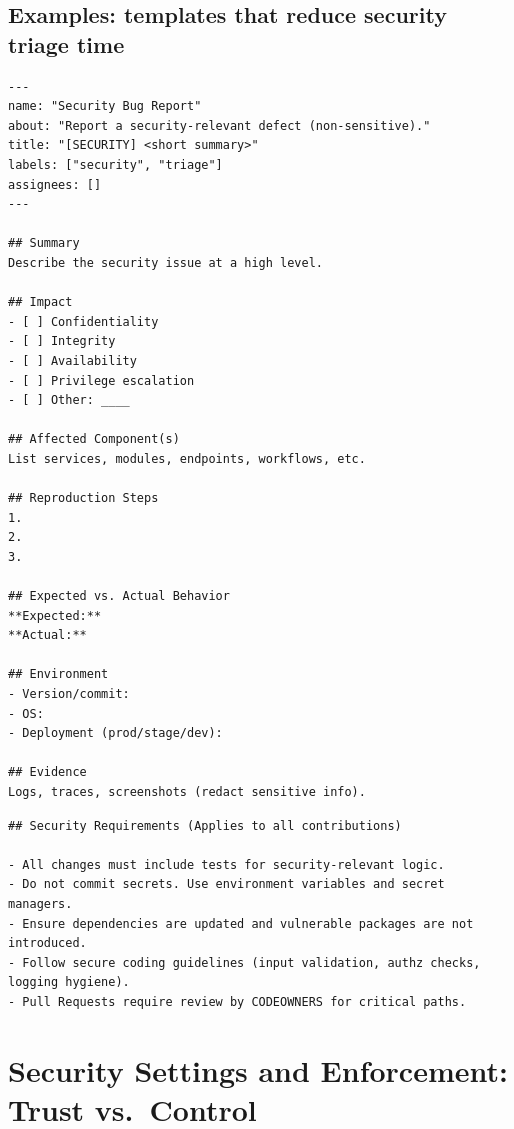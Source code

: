 \documentclass[11pt]{article}
\begin{document}
\subsection{Examples: templates that reduce security triage time}

\begin{examplebox}[title={Example: Security-focused bug report issue template (Markdown)}]
\begin{verbatim}
---
name: "Security Bug Report"
about: "Report a security-relevant defect (non-sensitive)."
title: "[SECURITY] <short summary>"
labels: ["security", "triage"]
assignees: []
---

## Summary
Describe the security issue at a high level.

## Impact
- [ ] Confidentiality
- [ ] Integrity
- [ ] Availability
- [ ] Privilege escalation
- [ ] Other: ____

## Affected Component(s)
List services, modules, endpoints, workflows, etc.

## Reproduction Steps
1.
2.
3.

## Expected vs. Actual Behavior
**Expected:**
**Actual:**

## Environment
- Version/commit:
- OS:
- Deployment (prod/stage/dev):

## Evidence
Logs, traces, screenshots (redact sensitive info).
\end{verbatim}
\end{examplebox}

\begin{examplebox}[title={Example: \texttt{CONTRIBUTING.md} security addendum}]
\begin{verbatim}
## Security Requirements (Applies to all contributions)

- All changes must include tests for security-relevant logic.
- Do not commit secrets. Use environment variables and secret managers.
- Ensure dependencies are updated and vulnerable packages are not introduced.
- Follow secure coding guidelines (input validation, authz checks, logging hygiene).
- Pull Requests require review by CODEOWNERS for critical paths.
\end{verbatim}
\end{examplebox}

\section{Security Settings and Enforcement: Trust vs.\ Control}
\end{document}
